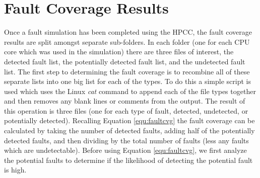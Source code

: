 \documentclass[12pt]{report}
\begin{document}
\section{Fault Coverage Results}
Once a fault simulation has been completed using the HPCC, the fault coverage results are split amongst separate sub-folders.  In each folder (one for each CPU core which was used in the simulation) there are three files of interest, the detected fault list, the potentially detected fault list, and the undetected fault list.  The first step to determining the fault coverage is to recombine all of these separate lists into one big list for each of the types.  To do this a simple script is used which uses the Linux \textit{cat} command to append each of the file types together and then removes any blank lines or comments from the output.  The result of this operation is three files (one for each type of fault, detected, undetected, or potentially detected).  Recalling Equation \ref{equ:faultcvg} the fault coverage can be calculated by taking the number of detected faults, adding half of the potentially detected faults, and then dividing by the total number of faults (less any faults which are undetectable).  Before using Equation \ref{equ:faultcvg}, we first analyze the potential faults to determine if the likelihood of detecting the potential fault is high.
\end{document}
